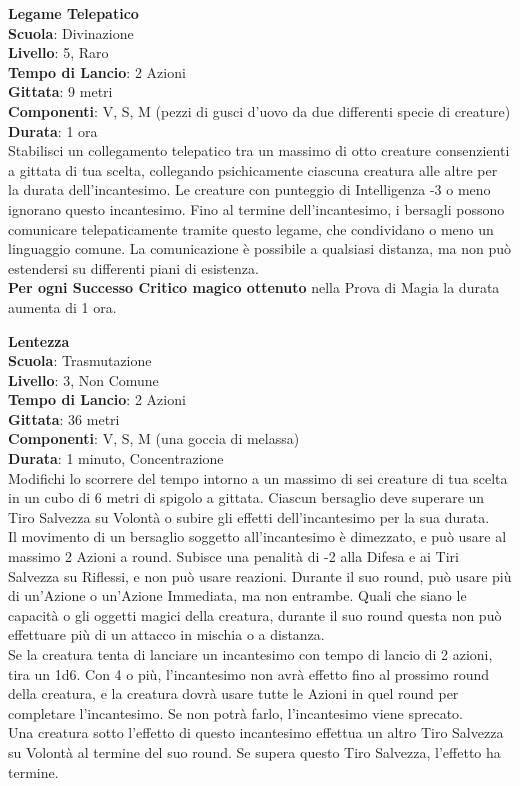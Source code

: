 \begin{multicols}{2}
\medskip\textbf{Legame Telepatico}\\
\textbf{Scuola}: Divinazione\\
\textbf{Livello}: 5, Raro\\
\textbf{Tempo di Lancio}: 2 Azioni\\
\textbf{Gittata}: 9 metri\\
\textbf{Componenti}: V, S, M (pezzi di gusci d'uovo da due differenti specie di creature)\\
\textbf{Durata}: 1 ora\\
Stabilisci un collegamento telepatico tra un massimo di otto creature consenzienti a gittata di tua scelta, collegando psichicamente ciascuna creatura alle altre per la durata dell'incantesimo. Le creature con punteggio di Intelligenza -3 o meno ignorano questo incantesimo. Fino al termine dell'incantesimo, i bersagli possono comunicare telepaticamente tramite questo legame, che condividano o meno un linguaggio comune. La comunicazione è possibile a qualsiasi distanza, ma non può estendersi su differenti piani di esistenza.\\
\textbf{Per ogni Successo Critico magico ottenuto} nella Prova di Magia la durata aumenta di 1 ora.

\medskip\hypertarget{lentezza}{\textbf{Lentezza}}\\
\textbf{Scuola}: Trasmutazione\\
\textbf{Livello}: 3, Non Comune\\
\textbf{Tempo di Lancio}: 2 Azioni\\
\textbf{Gittata}: 36 metri\\
\textbf{Componenti}: V, S, M (una goccia di melassa) \\
\textbf{Durata}: 1 minuto, Concentrazione\\
Modifichi lo scorrere del tempo intorno a un massimo di sei creature di tua scelta in un cubo di 6 metri di spigolo a gittata. Ciascun bersaglio deve superare un Tiro Salvezza su Volontà o subire gli effetti dell'incantesimo per la sua durata.\\
Il movimento di un bersaglio soggetto all'incantesimo è dimezzato, e può usare al massimo 2 Azioni a round. Subisce una penalità di -2 alla Difesa e ai Tiri Salvezza su Riflessi, e non può usare reazioni. Durante il suo round, può usare più di un'Azione o un'Azione Immediata, ma non entrambe. Quali che siano le capacità o gli oggetti magici della creatura, durante il suo round questa non può effettuare più di un attacco in mischia o a distanza.\\
Se la creatura tenta di lanciare un incantesimo con tempo di lancio di 2 azioni, tira un 1d6. Con 4 o più, l'incantesimo non avrà effetto fino al prossimo round della creatura, e la creatura dovrà usare tutte le Azioni in quel round per completare l'incantesimo. Se non potrà farlo, l'incantesimo viene sprecato.\\
Una creatura sotto l'effetto di questo incantesimo effettua un altro Tiro Salvezza su Volontà al termine del suo round. Se supera questo Tiro Salvezza, l'effetto ha termine.


\end{multicols}
